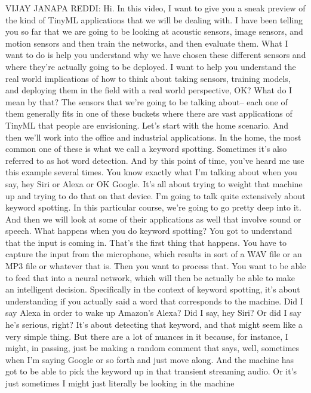 VIJAY JANAPA REDDI: Hi.
In this video, I want to give you a sneak preview
of the kind of TinyML applications that we will be dealing with.
I have been telling you so far that we are
going to be looking at acoustic sensors, image sensors, and motion sensors
and then train the networks, and then evaluate them.
What I want to do is help you understand why
we have chosen these different sensors and where
they're actually going to be deployed.
I want to help you understand the real world implications of how
to think about taking sensors, training models, and deploying them
in the field with a real world perspective, OK?
What do I mean by that?
The sensors that we're going to be talking about--
each one of them generally fits in one of these buckets
where there are vast applications of TinyML that people are envisioning.
Let's start with the home scenario.
And then we'll work into the office and industrial applications.
In the home, the most common one of these
is what we call a keyword spotting.
Sometimes it's also referred to as hot word detection.
And by this point of time, you've heard me use this example several times.
You know exactly what I'm talking about when you say, hey Siri or Alexa
or OK Google.
It's all about trying to weight that machine up
and trying to do that on that device.
I'm going to talk quite extensively about keyword spotting.
In this particular course, we're going to go pretty deep into it.
And then we will look at some of their applications
as well that involve sound or speech.
What happens when you do keyword spotting?
You got to understand that the input is coming in.
That's the first thing that happens.
You have to capture the input from the microphone,
which results in sort of a WAV file or an MP3 file or whatever that is.
Then you want to process that.
You want to be able to feed that into a neural network, which
will then be actually be able to make an intelligent decision.
Specifically in the context of keyword spotting,
it's about understanding if you actually said
a word that corresponds to the machine.
Did I say Alexa in order to wake up Amazon's Alexa?
Did I say, hey Siri?
Or did I say he's serious, right?
It's about detecting that keyword, and that
might seem like a very simple thing.
But there are a lot of nuances in it because, for instance, I
might, in passing, just be making a random comment that says, well,
sometimes when I'm saying Google or so forth and just move along.
And the machine has got to be able to pick the keyword up
in that transient streaming audio.
Or it's just sometimes I might just literally be looking in the machine
